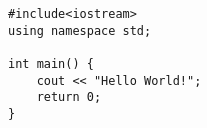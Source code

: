 \documentclass{article}
\begin{document}
\begin{lstlisting}
#include<iostream>
using namespace std;

int main() {
	cout << "Hello World!";
	return 0;
}
\end{lstlisting}
\end{document}
